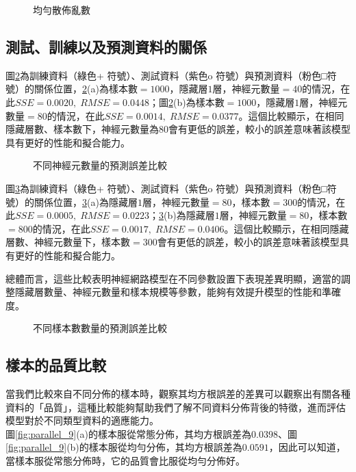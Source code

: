 \documentclass[12pt, a4paper]{article}
\begin{document}
\begin{figure}[H]
\centering
{}
\caption{均勻散佈亂數}
\label{fig:parallel_1}
\end{figure}

\subsection{測試、訓練以及預測資料的關係}
圖\;\ref{fig:parallel_2}\;為訓練資料（綠色+ 符號）、測試資料（紫色o 符號）與預測資料（粉色□符號）的關係位置，\;\ref{fig:parallel_2}\;(a)\;為樣本數\;$=1000$\;，隱藏層\;$1$\;層，神經元數量\;$=40$\;的情況，在此\;$SSE=0.0020,\;RMSE=0.0448$\;；圖\;\ref{fig:parallel_2}\;(b)\;為樣本數\;$=1000$\;，隱藏層\;$1$\;層，神經元數量\;$=80$\;的情況，在此\;$SSE=0.0014,\;RMSE=0.0377$\;。這個比較顯示，在相同隱藏層數、樣本數下，神經元數量為\;$80$\;會有更低的誤差，較小的誤差意味著該模型具有更好的性能和擬合能力。


\begin{figure}[h]
\centering
{}
\caption{不同神經元數量的預測誤差比較}
\label{fig:parallel_2}
\end{figure}

圖\;\ref{fig:parallel_3}\;為訓練資料（綠色+ 符號）、測試資料（紫色o 符號）與預測資料（粉色□符號）的關係位置，\;\ref{fig:parallel_3}\;(a)\;為隱藏層\;$1$\;層，神經元數量\;$=80$\;，樣本數\;$=300$\;的情況，在此\;$SSE=0.0005,\;RMSE=0.0223$\;；\;\ref{fig:parallel_3}\;(b)\;為隱藏層\;$1$\;層，神經元數量\;$=80$\;，樣本數\;$=800$\;的情況，在此\;$SSE=0.0017,\;RMSE=0.0406$\;。這個比較顯示，在相同隱藏層數、神經元數量下，樣本數\;$=300$\;會有更低的誤差，較小的誤差意味著該模型具有更好的性能和擬合能力。

總體而言，這些比較表明神經網路模型在不同參數設置下表現差異明顯，適當的調整隱藏層數量、神經元數量和樣本規模等參數，能夠有效提升模型的性能和準確度。

\begin{figure}[H]
\centering
{}
\caption{不同樣本數數量的預測誤差比較}
\label{fig:parallel_3}
\end{figure}

\subsection{樣本的品質比較}
當我們比較來自不同分佈的樣本時，觀察其均方根誤差的差異可以觀察出有關各種資料的「品質」，這種比較能夠幫助我們了解不同資料分佈背後的特徵，進而評估模型對於不同類型資料的適應能力。\\
圖\;\ref{fig:parallel_9}\;(a)\;的樣本服從常態分佈，其均方根誤差為\;$0.0398$\;、圖\;\ref{fig:parallel_9}\;(b)\;的樣本服從均勻分佈，其均方根誤差為\;$0.0591$\;，因此可以知道，當樣本服從常態分佈時，它的品質會比服從均勻分佈好。
\end{document}
